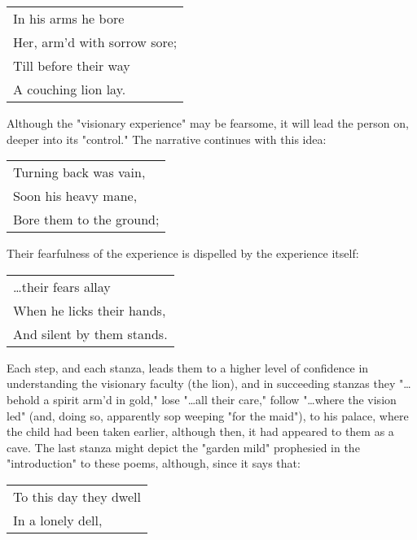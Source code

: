 \begin{center}
	\begin{tabular}{l}
		In his arms he bore          \\
		Her, arm'd with sorrow sore; \\
		Till before their way        \\
		A couching lion lay.
	\end{tabular}
\end{center}
\hspace*{5mm}Although the "visionary experience" may be fearsome, it will lead the person on, deeper into its "control." The narrative
continues with this idea:\par
\begin{center}
	\begin{tabular}{l}
		Turning back was vain, \\
		Soon his heavy mane,   \\
		Bore them to the ground;
	\end{tabular}
\end{center}
\hspace*{5mm}Their fearfulness of the experience is dispelled by the experience itself:\par
\begin{center}
	\begin{tabular}{l}
		\dots their fears allay    \\
		When he licks their hands, \\
		And silent by them stands.
	\end{tabular}
\end{center}
\hspace*{5mm}Each step, and each stanza, leads them to a higher level of confidence in understanding the visionary faculty (the lion), and in
succeeding stanzas they "\dots behold a spirit arm'd in gold," lose "\dots all their care," follow "\dots where the vision
led" (and, doing so, apparently sop weeping "for the maid"), to his palace, where the child had been taken earlier, although then,
it had appeared to them as a cave. The last stanza might depict the "garden mild" prophesied in the "introduction" to these poems, although,
since it says that:\par
\begin{center}
	\begin{tabular}{l}
		To this day they dwell \\
		In a lonely dell,
	\end{tabular}
\end{center}
